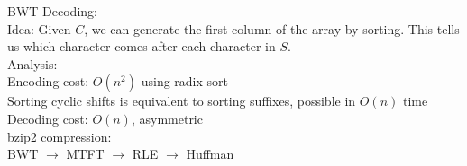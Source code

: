 \documentclass[12pt]{article}
\begin{document}
{BWT Decoding:\\
Idea: Given $C$, we can generate the first column of the array by sorting. This tells us which character comes after each character in $S$. \\

Analysis:\\
Encoding cost: $O(n^2)$ using radix sort\\
Sorting cyclic shifts is equivalent to sorting suffixes, possible in $O(n)$ time\\

Decoding cost: $O(n)$, asymmetric\\

bzip2 compression:\\
BWT $\rightarrow$ MTFT $\rightarrow$ RLE $\rightarrow$ Huffman 


}
\end{document}
